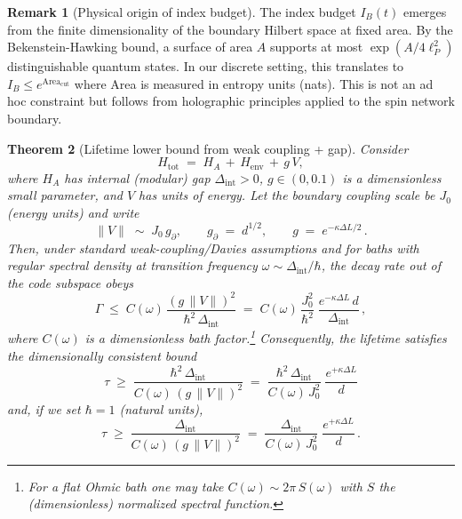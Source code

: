 \documentclass[11pt]{article}
\theoremstyle{plain}
\newtheorem{theorem}{Theorem}[section]
\theoremstyle{definition}
\newtheorem{remark}[theorem]{Remark}
\begin{document}
\begin{remark}[Physical origin of index budget]
  The index budget $I_B(t)$ emerges from the finite dimensionality of the boundary Hilbert space at fixed area. By the Bekenstein-Hawking bound, a surface of area $A$ supports at most $\exp(A/4\ell_P^2)$ distinguishable quantum states. In our discrete setting, this translates to $I_B \leq e^{\mathrm{Area}_{\mathrm{cut}}}$ where Area is measured in entropy units (nats). This is not an ad hoc constraint but follows from holographic principles applied to the spin network boundary.
\end{remark}

\begin{theorem}[Lifetime lower bound from weak coupling + gap]\label{thm:lifetime-derived}
  Consider
  \[
    H_{\mathrm{tot}} \;=\; H_A \,+\, H_{\mathrm{env}} \,+\, g\,V,
  \]
  where $H_A$ has internal (modular) gap $\Delta_{\mathrm{int}}>0$, $g\in(0,0.1)$ is a \emph{dimensionless} small parameter, and $V$ has units of energy. Let the boundary coupling scale be $J_0$ (energy units) and write
  \[
    \|V\| \;\sim\; J_0 \, g_{\partial},
    \qquad
    g_{\partial} \;=\; d^{1/2},
    \qquad
    g \;=\; e^{-\kappa \Delta L/2}\,.
  \]
  Then, under standard weak-coupling/Davies assumptions and for baths with regular spectral density at transition frequency $\omega\sim \Delta_{\mathrm{int}}/\hbar$, the decay rate out of the code subspace obeys
  \begin{equation}\label{eq:Gamma-bound-units}
    \Gamma \;\le\; C(\omega)\,\frac{(g\,\|V\|)^2}{\hbar^2\,\Delta_{\mathrm{int}}}
    \;=\; C(\omega)\,\frac{J_0^2}{\hbar^2}\;
    \frac{e^{-\kappa \Delta L}\, d}{\Delta_{\mathrm{int}}}\,,
  \end{equation}
  where $C(\omega)$ is a dimensionless bath factor.\footnote{For a flat Ohmic bath one may take $C(\omega)\sim 2\pi\,S(\omega)$ with $S$ the (dimensionless) normalized spectral function.}
  Consequently, the lifetime satisfies the \emph{dimensionally consistent} bound
  \begin{equation}\label{eq:lifetime-master-units}
    \boxed{\quad
      \tau \;\ge\; \frac{\hbar^2\,\Delta_{\mathrm{int}}}{C(\omega)\,(g\,\|V\|)^2}
      \;=\; \frac{\hbar^2\,\Delta_{\mathrm{int}}}{C(\omega)\,J_0^2}\;
      \frac{e^{+\kappa \Delta L}}{d}
    \quad}
  \end{equation}
  and, if we set $\hbar=1$ (natural units),
  \begin{equation}\label{eq:lifetime-master-hbar1}
    \boxed{\quad
      \tau \;\ge\; \frac{\Delta_{\mathrm{int}}}{C(\omega)\,(g\,\|V\|)^2}
      \;=\; \frac{\Delta_{\mathrm{int}}}{C(\omega)\,J_0^2}\;
      \frac{e^{+\kappa \Delta L}}{d}\,.
    \quad}
  \end{equation}
\end{theorem}
\end{document}
